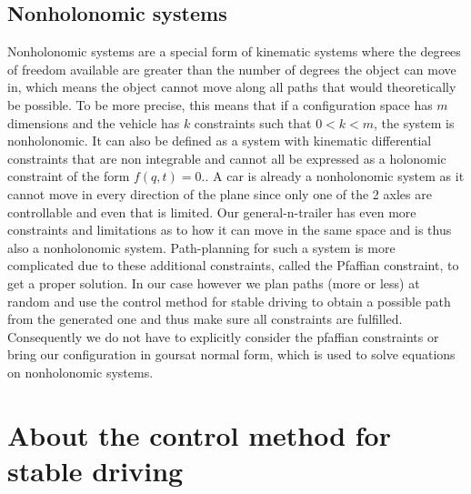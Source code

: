 
\subsection{Nonholonomic systems}
\label{sec:nonholonomic_systems}

Nonholonomic systems are a special form of kinematic systems where the degrees of freedom available are greater than the number of degrees the object can move in, which means the object cannot move along all paths that would theoretically be possible. To be more precise, this means that if a configuration space has $m$ dimensions and the vehicle has $k$ constraints such that $0<k<m$, the system is nonholonomic. It can also be defined as a system with kinematic differential constraints that are non integrable and cannot all be expressed as a holonomic constraint of the form $f(q,t)=0$.\cite{29,30}. A car is already a nonholonomic system as it cannot move in every direction of the plane since only one of the 2 axles are controllable and even that is limited. Our general-n-trailer has even more constraints and limitations as to how it can move in the same space and is thus also a nonholonomic system. Path-planning for such a system is more complicated due to these additional constraints, called the Pfaffian constraint, to get a proper solution. 
In our case however we plan paths (more or less) at random and use the control method for stable driving to obtain a possible path from the generated one and thus make sure all constraints are fulfilled. Consequently we do not have to explicitly consider the pfaffian constraints or bring our configuration in goursat normal form, which is used to solve equations on nonholonomic systems.

\section{About the control method for stable driving}
\label{sec:about_control_method}

